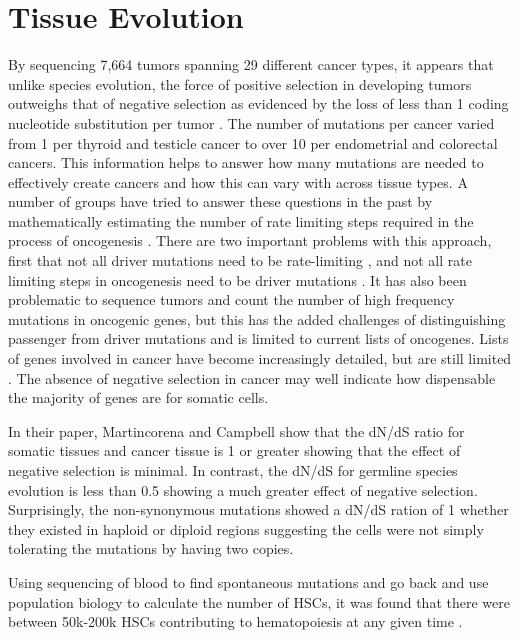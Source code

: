 \documentclass[]{book}
\begin{document}
\section{Tissue Evolution}\label{tissue-evolution}

By sequencing 7,664 tumors spanning 29 different cancer types, it
appears that unlike species evolution, the force of positive selection
in developing tumors outweighs that of negative selection as evidenced
by the loss of less than 1 coding nucleotide substitution per tumor
\citep{martincorena2017universal}. The number of mutations per cancer
varied from 1 per thyroid and testicle cancer to over 10 per endometrial
and colorectal cancers. This information helps to answer how many
mutations are needed to effectively create cancers and how this can vary
with across tissue types. A number of groups have tried to answer these
questions in the past by mathematically estimating the number of rate
limiting steps required in the process of oncogenesis
\citep{armitage1954age, tomasetti2015variation}. There are two important
problems with this approach, first that not all driver mutations need to
be rate-limiting \citep{yates2015subclonal}, and not all rate limiting
steps in oncogenesis need to be driver mutations
\citep{martincorena2015high}. It has also been problematic to sequence
tumors and count the number of high frequency mutations in oncogenic
genes, but this has the added challenges of distinguishing passenger
from driver mutations and is limited to current lists of oncogenes.
Lists of genes involved in cancer have become increasingly detailed, but
are still limited \citep{lawrence2014discovery, kandoth2013mutational}.
The absence of negative selection in cancer may well indicate how
dispensable the majority of genes are for somatic cells.

In their paper, Martincorena and Campbell show that the dN/dS ratio for
somatic tissues and cancer tissue is 1 or greater showing that the
effect of negative selection is minimal. In contrast, the dN/dS for
germline species evolution is less than 0.5 showing a much greater
effect of negative selection. Surprisingly, the non-synonymous mutations
showed a dN/dS ration of 1 whether they existed in haploid or diploid
regions suggesting the cells were not simply tolerating the mutations by
having two copies.

Using sequencing of blood to find spontaneous mutations and go back and
use population biology to calculate the number of HSCs, it was found
that there were between 50k-200k HSCs contributing to hematopoiesis at
any given time \citep{lee2018population}.
\end{document}
